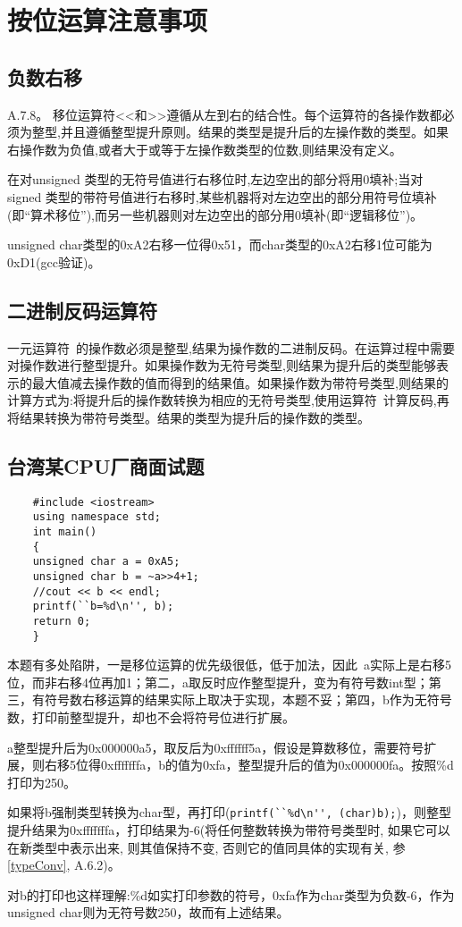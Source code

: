 \section{按位运算注意事项}
\subsection{负数右移}
\cite{krc}A.7.8。
移位运算符<<和>>遵循从左到右的结合性。每个运算符的各操作数都必须为整型,并且遵循整型提升原则。结果的类型是提升后的左操作数的类型。如果右操作数为负值,或者大于或等于左操作数类型的位数,则结果没有定义。

在对unsigned 类型的无符号值进行右移位时,左边空出的部分将用0填补;当对 signed 类型的带符号值进行右移时,某些机器将对左边空出的部分用符号位填补(即“算术移位”),而另一些机器则对左边空出的部分用0填补(即“逻辑移位”)。 

unsigned char类型的0xA2右移一位得0x51，而char类型的0xA2右移1位可能为0xD1(gcc验证)。

\subsection{二进制反码运算符}
一元运算符~的操作数必须是整型,结果为操作数的二进制反码。在运算过程中需要对操作数进行整型提升。如果操作数为无符号类型,则结果为提升后的类型能够表示的最大值减去操作数的值而得到的结果值。如果操作数为带符号类型,则结果的计算方式为:将提升后的操作数转换为相应的无符号类型,使用运算符~计算反码,再将结果转换为带符号类型。结果的类型为提升后的操作数的类型。

\subsection{台湾某CPU厂商面试题}
\begin{lstlisting}
    #include <iostream>
    using namespace std;
    int main()
    {
	unsigned char a = 0xA5;
	unsigned char b = ~a>>4+1;
	//cout << b << endl;
	printf(``b=%d\n'', b);
	return 0;
    }
\end{lstlisting}

本题有多处陷阱，一是移位运算的优先级很低，低于加法，因此~a实际上是右移5位，而非右移4位再加1；第二，a取反时应作整型提升，变为有符号数int型；第三，有符号数右移运算的结果实际上取决于实现，本题不妥；第四，b作为无符号数，打印前整型提升，却也不会将符号位进行扩展。

a整型提升后为0x000000a5，取反后为0xffffff5a，假设是算数移位，需要符号扩展，则右移5位得0xfffffffa，b的值为0xfa，整型提升后的值为0x000000fa。按照\%d打印为250。


如果将b强制类型转换为char型，再打印(\lstinline!printf(``%d\n'', (char)b);!)，则整型提升结果为0xfffffffa，打印结果为-6(将任何整数转换为带符号类型时, 如果它可以在新类型中表示出来, 则其值保持不变, 否则它的值同具体的实现有关, 参\cite{self}\ref{typeConv}, \cite{krc}A.6.2)。 

对b的打印也这样理解:\%d如实打印参数的符号，0xfa作为char类型为负数-6，作为unsigned char则为无符号数250，故而有上述结果。













